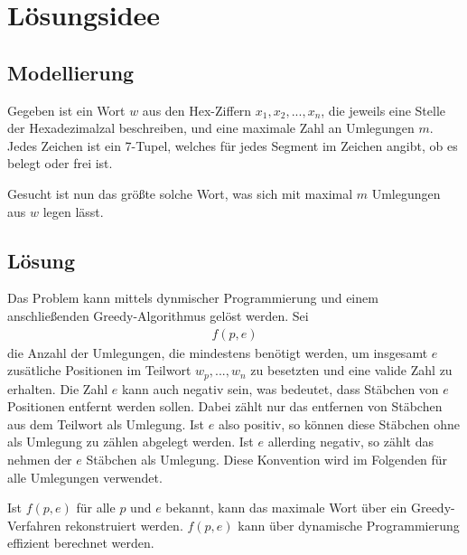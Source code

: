 \documentclass[a4paper,10pt,ngerman]{scrartcl}
\begin{document}
\maketitle
\tableofcontents

\section{Lösungsidee}
\subsection{Modellierung}
Gegeben ist ein Wort $w$ aus den Hex-Ziffern $x_1, x_2, ..., x_n$, die jeweils eine Stelle der Hexadezimalzal beschreiben, und eine maximale Zahl an Umlegungen $m$. 
Jedes Zeichen ist ein 7-Tupel, welches für jedes Segment im Zeichen angibt, ob es belegt oder frei ist.

Gesucht ist nun das größte solche Wort, was sich mit maximal $m$ Umlegungen aus $w$ legen lässt.

\subsection{Lösung}
Das Problem kann mittels dynmischer Programmierung und einem anschließenden Greedy-Algorithmus gelöst werden. 
Sei
\begin{align}
    f(p, e)
\end{align}
die Anzahl der Umlegungen, die mindestens benötigt werden, um insgesamt $e$ zusätliche Positionen im Teilwort $w_p, ..., w_n$ zu besetzten und eine valide Zahl zu erhalten. Die Zahl $e$ kann auch negativ sein, was bedeutet, dass Stäbchen von $e$ Positionen entfernt werden sollen. Dabei zählt nur das entfernen von Stäbchen aus dem Teilwort als Umlegung. Ist $e$ also positiv, so können diese Stäbchen ohne als Umlegung zu zählen abgelegt werden. Ist $e$ allerding negativ, so zählt das nehmen der $e$ Stäbchen als Umlegung. Diese Konvention wird im Folgenden für alle Umlegungen verwendet.

Ist $f(p, e)$ für alle $p$ und $e$ bekannt, kann das maximale Wort über ein Greedy-Verfahren rekonstruiert werden. 
$f(p, e)$ kann über dynamische Programmierung effizient berechnet werden. 
\end{document}
